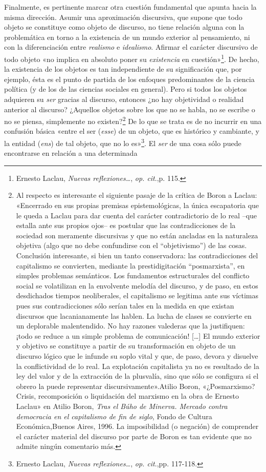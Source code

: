 Finalmente, es pertinente marcar otra cuestión fundamental que apunta hacia la misma dirección. Asumir una aproximación discursiva, que supone que todo objeto se constituye como objeto de discurso, no tiene relación alguna con la problemática en torno a la existencia de un mundo exterior al pensamiento, ni con la diferenciación entre \emph{realismo} e \emph{idealismo}. Afirmar el carácter discursivo de todo objeto «no implica en absoluto poner su \emph{existencia} en cuestión»\footnote{Ernesto Laclau, \emph{Nuevas reflexiones\ldots{}}, \emph{op. cit}.,p. 115.}. De hecho, la existencia de los objetos es tan independiente de su significación que, por ejemplo, ésta es el punto de partida de los enfoques predominantes de la ciencia política (y de los de las ciencias sociales en general). Pero si todos los objetos adquieren su \emph{ser} gracias al discurso, entonces ¿no hay objetividad o realidad anterior al discurso? ¿Aquellos objetos sobre los que no se habla, no se escribe o no se piensa, simplemente no existen?\footnote{Al respecto es interesante el siguiente pasaje de la crítica de Boron a Laclau: «Encerrado en sus propias premisas epistemológicas, la única escapatoria que le queda a Laclau para dar cuenta del carácter contradictorio de lo real --que estalla ante sus propios ojos-- es postular que las contradicciones de la sociedad son meramente discursivas y que no están ancladas en la naturaleza objetiva (algo que no debe confundirse con el ``objetivismo'') de las cosas. Conclusión interesante, si bien un tanto conservadora: las contradicciones del capitalismo se convierten, mediante la prestidigitación ``posmarxista'', en simples problemas semánticos. Los fundamentos estructurales del conflicto social se volatilizan en la envolvente melodía del discurso, y de paso, en estos desdichados tiempos neoliberales, el capitalismo se legitima ante sus víctimas pues sus contradicciones sólo serían tales en la medida en que existan discursos que lacanianamente las hablen. La lucha de clases se convierte en un deplorable malentendido. No hay razones valederas que la justifiquen: ¡todo se reduce a un simple problema de comunicación! {[}\ldots{]} El mundo exterior y objetivo se constituye a partir de su transformación en objeto de un discurso lógico que le infunde su soplo vital y que, de paso, devora y disuelve la conflictividad de lo real. La explotación capitalista ya no es resultado de la ley del valor y de la extracción de la plusvalía, sino que sólo se configura si el obrero la puede representar discursivamente».Atilio Boron, «¿Posmarxismo? Crisis, recomposición o liquidación del marxismo en la obra de Ernesto Laclau» en Atilio Boron, \emph{Tras el Búho de Minerva. Mercado contra democracia en el capitalismo de fin de siglo}, Fondo de Cultura Económica,Buenos Aires, 1996. La imposibilidad (o negación) de comprender el carácter material del discurso por parte de Boron es tan evidente que no admite ningún comentario más.} De lo que se trata es de no incurrir en una confusión básica «entre el ser (\emph{esse}) de un objeto, que es histórico y cambiante, y la entidad (\emph{ens}) de tal objeto, que no lo es»\footnote{Ernesto Laclau, \emph{Nuevas reflexiones\ldots{}}, \emph{op. cit}.,pp. 117-118.}. El \emph{ser} de una cosa sólo puede encontrarse en relación a una determinada 